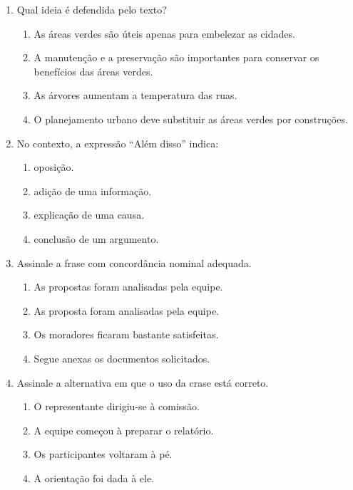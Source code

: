 \documentclass[12pt,a4paper]{article}
\begin{document}
\begin{enumerate}
  \item Qual ideia é defendida pelo texto?
  \begin{enumerate}[label=\alph*)]
    \item As áreas verdes são úteis apenas para embelezar as cidades.
    \item A manutenção e a preservação são importantes para conservar os benefícios das áreas verdes.
    \item As árvores aumentam a temperatura das ruas.
    \item O planejamento urbano deve substituir as áreas verdes por construções.
  \end{enumerate}

  \item No contexto, a expressão ``Além disso'' indica:
  \begin{enumerate}[label=\alph*)]
    \item oposição.
    \item adição de uma informação.
    \item explicação de uma causa.
    \item conclusão de um argumento.
  \end{enumerate}

  \item Assinale a frase com concordância nominal adequada.
  \begin{enumerate}[label=\alph*)]
    \item As propostas foram analisadas pela equipe.
    \item As proposta foram analisadas pela equipe.
    \item Os moradores ficaram bastante satisfeitas.
    \item Segue anexas os documentos solicitados.
  \end{enumerate}

  \item Assinale a alternativa em que o uso da crase está correto.
  \begin{enumerate}[label=\alph*)]
    \item O representante dirigiu-se à comissão.
    \item A equipe começou à preparar o relatório.
    \item Os participantes voltaram à pé.
    \item A orientação foi dada à ele.
  \end{enumerate}
\end{enumerate}
\end{document}
